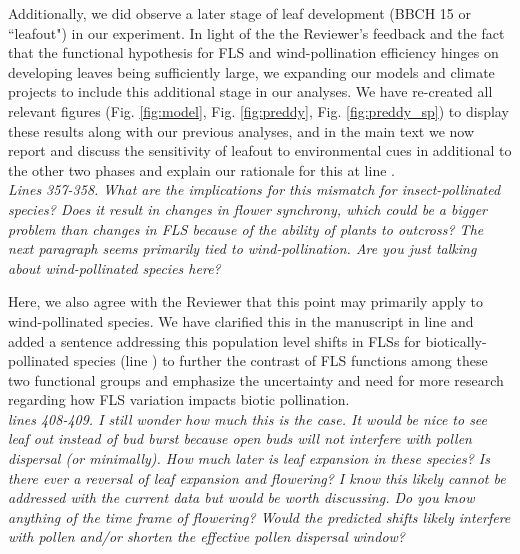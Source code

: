 \documentclass[11pt]{article}
\begin{document}
\noindent Additionally, we did observe a later stage of leaf development (BBCH 15 or ``leafout") in our experiment. In light of the the Reviewer's feedback and the fact that the functional hypothesis for FLS and wind-pollination efficiency hinges on developing leaves being sufficiently large, we expanding our models and climate projects to include this additional stage in our analyses. We have re-created all relevant figures (Fig. \ref{fig:model}, Fig. \ref{fig:preddy}, Fig. \ref{fig:preddy_sp}) to display these results along with our previous analyses, and in the main text we now report and discuss the sensitivity of leafout to environmental cues in additional to the other two phases and explain our rationale for this at line .\\ 

\emph{Lines  357-358. What are the implications for this mismatch for insect-pollinated species? Does it result in changes in flower synchrony, which could be a bigger problem than changes in FLS because of the ability of plants to outcross? The next paragraph seems primarily tied to wind-pollination. Are you just talking about wind-pollinated species here?}
 
\noindent Here, we also agree with the Reviewer that this point may primarily apply to wind-pollinated species. We have clarified this in the manuscript in line  and added a sentence addressing this population level shifts in FLSs for biotically-pollinated species (line ) to further the contrast of FLS functions among these two functional groups and emphasize the uncertainty and need for more research regarding how FLS variation impacts biotic pollination. \\
 
\emph{lines 408-409. I still wonder how much this is the case. It would be nice to see leaf out instead of bud burst because open buds will not interfere with pollen dispersal (or minimally). How much later is leaf expansion in these species? Is there ever a reversal of leaf expansion and flowering? I know this likely cannot be addressed with the current data but would be worth discussing. Do you know anything of the time frame of flowering? Would the predicted shifts likely interfere with pollen and/or shorten the effective pollen dispersal window?}\\
\end{document}
